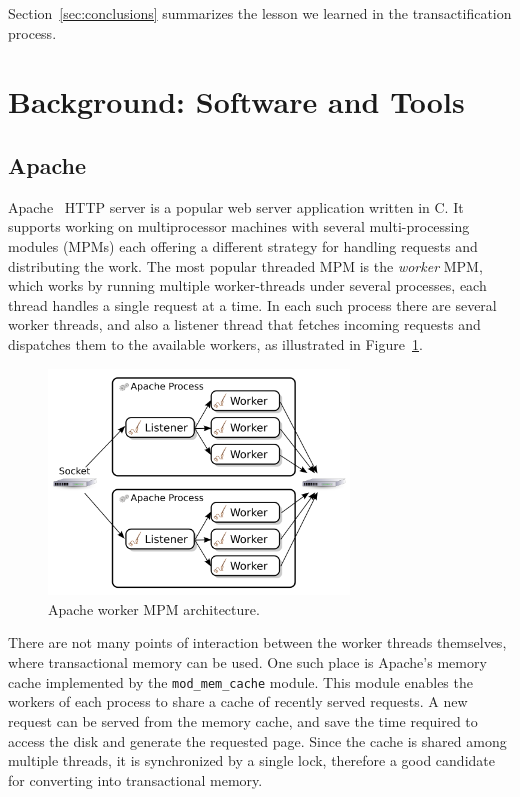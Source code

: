 \documentclass[preprint,11pt]{sigplanconf}
\let \cite = \citep
\begin{document}
Section~\ref{sec:conclusions} summarizes the lesson we learned in the 
transactification process.

\section{Background: Software and Tools}
\label{sec:background}

\subsection{Apache}\label{sec:apache}

Apache~\cite{apache} HTTP server is a popular web server application written in
C. It supports working on multiprocessor machines with several multi-processing
modules (MPMs) each offering a different strategy for handling requests and
distributing the work. The most popular threaded MPM is the \emph{worker} MPM,
which works by running multiple worker-threads under several processes, each
thread handles a single request at a time. In each such process there are
several worker threads, and also a listener thread that fetches incoming
requests and dispatches them to the available workers, as illustrated in
Figure~\ref{fig:apache-worker-MPM}.

\begin{figure}
 \begin{center}
  \includegraphics[width=8cm]{Apache-Worker-MPM.png}
 \end{center}
 \caption{Apache worker MPM architecture.}
 \label{fig:apache-worker-MPM}
\end{figure}

There are not many points of interaction between the worker threads themselves,
where transactional memory can be used. One such place is Apache's memory cache
implemented by the {\tt mod\_mem\_cache} module. This module enables the workers
of each process to share a cache of recently served requests. A new request can
be served from the memory cache, and save the time required to access the disk
and generate the requested page. Since the cache is shared among multiple
threads, it is synchronized by a single lock, therefore a good candidate for
converting into transactional memory.
\end{document}
